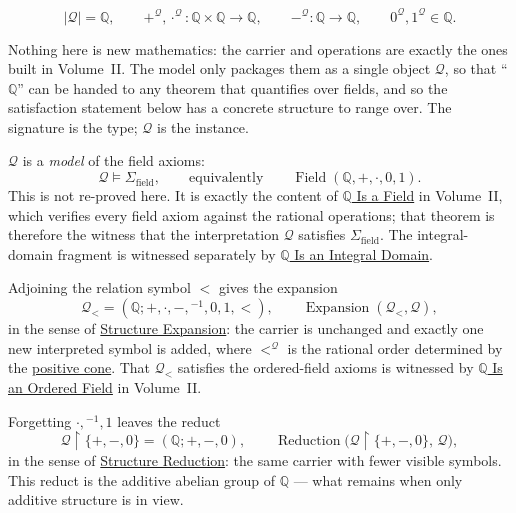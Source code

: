 \begin{remark*}
\[
|\mathcal{Q}|=\mathbb{Q},\qquad
+^{\mathcal{Q}},\cdot^{\mathcal{Q}}:\mathbb{Q}\times\mathbb{Q}\to\mathbb{Q},\qquad
-^{\mathcal{Q}}:\mathbb{Q}\to\mathbb{Q},\qquad
0^{\mathcal{Q}},1^{\mathcal{Q}}\in\mathbb{Q}.
\]
\end{remark*}\begin{remark*}[Interpretation]
Nothing here is new mathematics: the carrier and operations are exactly the ones
built in Volume~II. The model only packages them as a single object
$\mathcal{Q}$, so that ``$\mathbb{Q}$'' can be handed to any theorem that
quantifies over fields, and so the satisfaction statement below has a concrete
structure to range over. The signature is the type; $\mathcal{Q}$ is the
instance.
\end{remark*}

\begin{remark*}[Satisfaction]
$\mathcal{Q}$ is a \emph{model} of the field axioms:
\[
\mathcal{Q}\models \Sigma_{\mathrm{field}},
\qquad\text{equivalently}\qquad
\operatorname{Field}(\mathbb{Q},+,\cdot,0,1).
\]
This is not re-proved here. It is exactly the content of
\hyperref[thm:q-is-field]{$\mathbb{Q}$ Is a Field} in Volume~II, which verifies
every field axiom against the rational operations; that theorem is therefore the
witness that the interpretation $\mathcal{Q}$ satisfies
$\Sigma_{\mathrm{field}}$. The integral-domain fragment is witnessed separately
by \hyperref[thm:q-is-integral-domain]{$\mathbb{Q}$ Is an Integral Domain}.
\end{remark*}

\begin{remark*}
Adjoining the relation symbol $<$ gives the expansion
\[
\mathcal{Q}_{<}=(\mathbb{Q};+,\cdot,-,{}^{-1},0,1,<),
\qquad
\operatorname{Expansion}(\mathcal{Q}_{<},\mathcal{Q}),
\]
in the sense of \hyperref[def:structure-expansion]{Structure Expansion}: the
carrier is unchanged and exactly one new interpreted symbol is added, where
$<^{\mathcal{Q}}$ is the rational order determined by the
\hyperref[def:positive-cone]{positive cone}. That $\mathcal{Q}_{<}$ satisfies the
ordered-field axioms is witnessed by
\hyperref[thm:q-is-ordered-field]{$\mathbb{Q}$ Is an Ordered Field} in
Volume~II.
\end{remark*}

\begin{remark*}
Forgetting $\cdot,{}^{-1},1$ leaves the reduct
\[
\mathcal{Q}\!\restriction\!\{+,-,0\}=(\mathbb{Q};+,-,0),
\qquad
\operatorname{Reduction}\!\bigl(\mathcal{Q}\!\restriction\!\{+,-,0\},\,\mathcal{Q}\bigr),
\]
in the sense of \hyperref[def:structure-reduction]{Structure Reduction}: the same
carrier with fewer visible symbols. This reduct is the additive abelian group of
$\mathbb{Q}$ --- what remains when only additive structure is in view.
\end{remark*}

